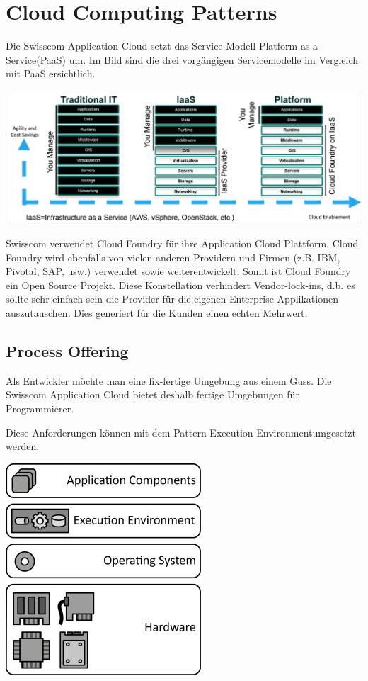 \chapter{Cloud Computing Patterns}
Die Swisscom Application Cloud setzt das Service-Modell \glqq Platform as a Service\grqq (PaaS) um. Im Bild sind die drei vorgängigen Servicemodelle im Vergleich mit PaaS ersichtlich.
 
\includegraphics[scale=0.25]{images/power-of-platform.png}

Swisscom verwendet Cloud Foundry für ihre Application Cloud Plattform. Cloud Foundry wird ebenfalls von vielen anderen Providern und Firmen (z.B. IBM, Pivotal, SAP, usw.) verwendet sowie weiterentwickelt. Somit ist Cloud Foundry ein Open Source Projekt. Diese Konstellation verhindert Vendor-lock-ins, d.b. es sollte sehr einfach sein die Provider für die eigenen Enterprise Applikationen auszutauschen. Dies generiert für die Kunden einen echten Mehrwert.
 
\section{Process Offering}
Als Entwickler möchte man eine fix-fertige Umgebung aus einem Guss. Die Swisscom Application Cloud bietet deshalb fertige Umgebungen für Programmierer. 

Diese Anforderungen können mit dem Pattern \glqq Execution Environment\grqq umgesetzt werden.

\includegraphics[scale=3]{images/execution-environment.png}

